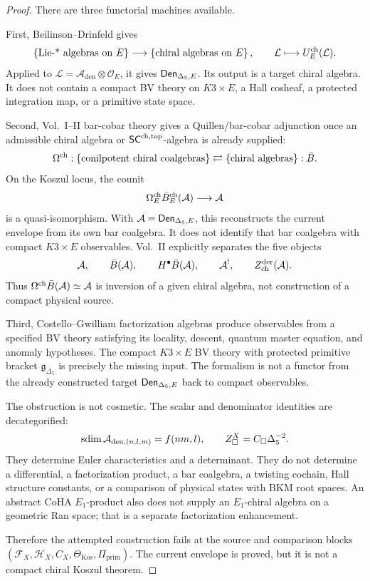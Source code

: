 \begin{proof}
There are three functorial machines available.

First, Beilinson--Drinfeld gives
$$
\left\{\hbox{Lie-* algebras on }E\right\}
\longrightarrow
\left\{\hbox{chiral algebras on }E\right\},
\qquad
\mathcal L\longmapsto U_E^{\mathrm{ch}}(\mathcal L).
$$
Applied to
\(\mathcal L=\mathcal A_{\mathrm{den}}\otimes\mathcal O_E\), it gives
\(\mathsf{Den}_{\Delta_5,E}\).  Its output is a target chiral algebra.  It does
not contain a compact BV theory on \(K3\times E\), a Hall cosheaf, a
protected integration map, or a primitive state space.

Second, Vol.~I--II bar-cobar theory gives a Quillen/bar-cobar
adjunction once an admissible chiral algebra or \(\mathsf{SC}^{\mathrm{ch,top}}\)-algebra is
already supplied:
$$
\Omega^{\mathrm{ch}}:\{\hbox{conilpotent chiral coalgebras}\}
\rightleftarrows
\{\hbox{chiral algebras}\}:\bar B.
$$
On the Koszul locus, the counit
$$
\Omega^{\mathrm{ch}}_E\bar B_E^{\mathrm{ch}}(\mathcal A)
\longrightarrow \mathcal A
$$
is a quasi-isomorphism.  With
\(\mathcal A=\mathsf{Den}_{\Delta_5,E}\), this reconstructs the current
envelope from its own bar coalgebra.  It does not identify that bar
coalgebra with compact \(K3\times E\) observables.  Vol.~II explicitly
separates the five objects
$$
\mathcal A,\qquad
\bar B(\mathcal A),\qquad
H^\bullet\bar B(\mathcal A),\qquad
\mathcal A^!,\qquad
Z^{\mathrm{der}}_{\mathrm{ch}}(\mathcal A).
$$
Thus \(\Omega^{\mathrm{ch}}\bar B(\mathcal A)\simeq\mathcal A\) is inversion of a
given chiral algebra, not construction of a compact physical source.

Third, Costello--Gwilliam factorization algebras produce observables
from a specified BV theory satisfying its locality, descent, quantum
master equation, and anomaly hypotheses.  The compact \(K3\times E\)
BV theory with protected primitive bracket
\(\mathfrak g_{\Delta_5}\) is precisely the missing input.  The
formalism is not a functor from the already constructed target
\(\mathsf{Den}_{\Delta_5,E}\) back to compact observables.

The obstruction is not cosmetic.  The scalar and denominator identities
are decategorified:
$$
\operatorname{sdim} \mathcal A_{\mathrm{den},(n,l,m)}=f(nm,l),
\qquad
Z^X_{\square}=C_{\square}\Delta_5^{-2}.
$$
They determine Euler characteristics and a determinant.  They do not
determine a differential, a factorization product, a bar coalgebra, a
twisting cochain, Hall structure constants, or a comparison of physical
states with BKM root spaces.  An abstract CoHA \(E_1\)-product also does
not supply an \(E_1\)-chiral algebra on a geometric Ran space; that is a
separate factorization enhancement.

Therefore the attempted construction fails at the source and comparison
blocks \((\mathcal F_X,\mathcal H_X,C_X,\Theta_{\mathrm{Kos}},
\Pi_{\mathrm{prim}})\).  The current envelope is proved, but it is not a
compact chiral Koszul theorem.
\end{proof}

